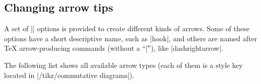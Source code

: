 \documentclass[a4paper]{ltxdoc}
\begin{document}
\begin{codeexample}[]
\end{codeexample}

\subsection{Changing arrow tips}
\label{sec:changing-arrow-tips}

A set of |\arrow| options is provided to create different kinds of
arrows.  Some of these options have a short descriptive name, such as
|hook|, and others are named after \TeX{} arrow-producing commands
(without a ``|\|''), like |dashrightarrow|.%

\begin{codeexample}[]
\end{codeexample}

The following list shows all available arrow types (each of them is a
style key located in |/tikz/commutative diagrams|).
\end{document}
